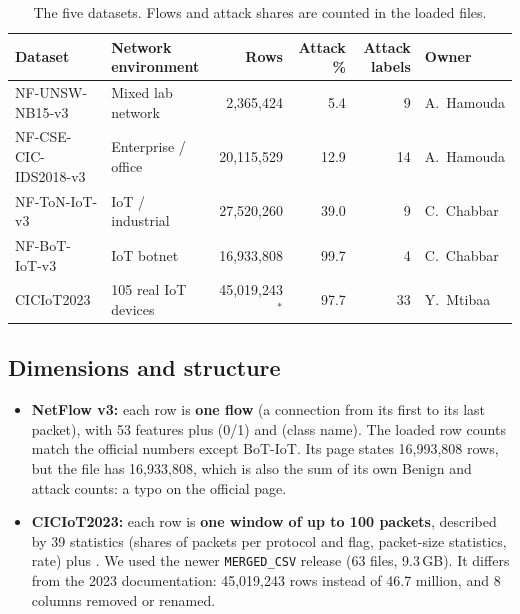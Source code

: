 \documentclass[12pt,a4paper]{article}
\newcommand{\var}[1]{\texttt{\detokenize{#1}}}
\begin{document}
\begin{table}[!htbp]\centering\small
\caption{The five datasets. Flows and attack shares are counted in the loaded files.}\label{tab:datasets}
\footnotesize\setlength{\tabcolsep}{4pt}
\begin{tabular}{L{4.1cm}L{2.7cm}rrrL{1.9cm}}
\toprule
Dataset & Network environment & Rows & Attack \% & Attack labels & Owner \\
\midrule
NF-UNSW-NB15-v3 \cite{unsw} & Mixed lab network & 2,365,424 & 5.4 & 9 & A.~Hamouda \\
NF-CSE-CIC-IDS2018-v3 \cite{cic2018} & Enterprise / office & 20,115,529 & 12.9 & 14 & A.~Hamouda \\
NF-ToN-IoT-v3 \cite{ton} & IoT / industrial & 27,520,260 & 39.0 & 9 & C.~Chabbar \\
NF-BoT-IoT-v3 \cite{bot} & IoT botnet & 16,933,808 & 99.7 & 4 & C.~Chabbar \\
CICIoT2023 \cite{ciciot2023} & 105 real IoT devices & 45,019,243$^{*}$ & 97.7 & 33 & Y.~Mtibaa \\
\bottomrule
\end{tabular}

\end{table}

\subsection{Dimensions and structure}
\begin{itemize}
  \item \textbf{NetFlow v3:} each row is \textbf{one flow} (a connection from its first to its last packet), with 53
        features plus \var{Label} (0/1) and \var{Attack} (class name). The loaded row counts match the official
        numbers except BoT-IoT. Its page states 16,993,808 rows, but the file has 16,933,808, which is also the sum of
        its own Benign and attack counts: a typo on the official page.
  \item \textbf{CICIoT2023:} each row is \textbf{one window of up to 100 packets}, described by 39 statistics (shares
        of packets per protocol and flag, packet-size statistics, rate) plus \var{Label}. We used the newer
        \texttt{MERGED\_CSV} release (63 files, 9.3\,GB). It differs from the 2023 documentation: 45,019,243 rows
        instead of 46.7 million, and 8 columns removed or renamed.
\end{itemize}
\end{document}
